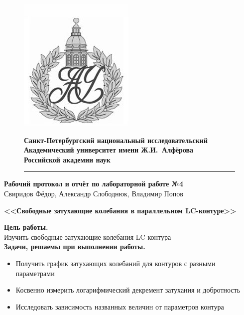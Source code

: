 \documentclass[ a4paper]{article}
\begin{document}
	\begin{figure}[htb]
		\begin{minipage}[c]{0.12\textwidth}
			\includegraphics[scale=0.25]{AU}
		\end{minipage}
		\hfill
		\begin{minipage}[t]{0.9\textwidth}
			{\Large\bfseries Санкт-Петербургский национальный исследовательский Академический университет имени Ж.И.~Алфёрова\\Российской академии наук}
		\end{minipage}
		\rule{164mm}{0.3mm}
	\end{figure}
	
	\begin{center}
		{\large\textbf{Рабочий протокол и отчёт по лабораторной работе №4 }}\\
		Свиридов Фёдор, Александр Слободнюк, Владимир Попов
	\end{center}
	\begin{center}
		\Large\bfseries{<<Свободные затухающие колебания в параллельном LC-контуре>>}\\
	\end{center}
	{\parindent=0pt\textbf{Цель работы.}}\\
	Изучить свободные затухающие колебания LC-контура\\
	
	{\parindent=0pt\textbf{Задачи, решаемы при выполнении работы.}}
	\begin{itemize}
		\item Получить график затухающих колебаний для контуров с разными параметрами
		\item Косвенно измерить логарифмический декремент затухания и добротность
		\item Исследовать зависимость названных величин от параметров контура
	\end{itemize}
	
\end{document}
